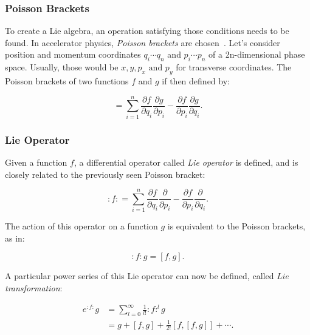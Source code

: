 \subsubsection{Poisson Brackets}

To create a Lie algebra, an operation satisfying those conditions needs to be found. In accelerator
physics, \textit{Poisson brackets} are chosen~\cite{dragt_overview_2013,roy_analysis_1992}. Let's
consider position and momentum coordinates $q_i \cdots q_n$ and $p_i \cdots p_n$  of a
2n-dimensional phase space. Usually, those would be $x, y, p_x \text{ and } p_y$ for transverse
coordinates. The Poisson brackets of two functions $f$ and $g$ if then defined by:

\begin{equation}
    [f,g] = \sum^n_{i=1} \frac{\partial f}{\partial q_i} \frac{\partial g}{\partial p_i}
                       - \frac{\partial f}{\partial p_i} \frac{\partial g}{\partial q_i}.
\end{equation}



\subsubsection{Lie Operator}

Given a function $f$, a differential operator called \textit{Lie operator} is defined, and is closely
related to the previously seen Poisson bracket:

\begin{equation}
    :f: = \sum^n_{i=1} \frac{\partial f}{\partial q_i} \frac{\partial}{\partial p_i}
                     - \frac{\partial f}{\partial p_i} \frac{\partial}{\partial q_i}.
\end{equation}

The action of this operator on a function $g$ is equivalent to the Poisson brackets, as in:

\begin{equation}
    :f:g = [f,g].
\end{equation}

A particular power series of this Lie operator can now be defined, called \textit{Lie
transformation}:

\begin{equation}
    \begin{aligned}
        e^{:f:}g &= \sum_{l=0}^\infty \frac{1}{l!} :f:^l g \\
                 &= g + [f,g] + \frac{1}{2!}[f, [f, g]] + \cdots .
    \end{aligned}
\end{equation}



